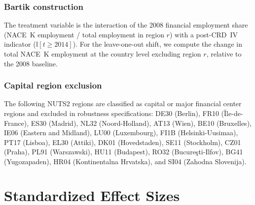 \documentclass[12pt]{article}
\newcommand{\ind}{\mathbb{I}}
\begin{document}
\subsubsection*{Bartik construction} The treatment variable is the interaction of the 2008 financial employment share (NACE~K employment / total employment in region $r$) with a post-CRD~IV indicator ($\ind[t \geq 2014]$). For the leave-one-out shift, we compute the change in total NACE~K employment at the country level excluding region $r$, relative to the 2008 baseline.

\subsubsection*{Capital region exclusion} The following NUTS2 regions are classified as capital or major financial center regions and excluded in robustness specifications: DE30 (Berlin), FR10 (\^{I}le-de-France), ES30 (Madrid), NL32 (Noord-Holland), AT13 (Wien), BE10 (Bruxelles), IE06 (Eastern and Midland), LU00 (Luxembourg), FI1B (Helsinki-Uusimaa), PT17 (Lisboa), EL30 (Attiki), DK01 (Hovedstaden), SE11 (Stockholm), CZ01 (Praha), PL91 (Warszawski), HU11 (Budapest), RO32 (Bucure\c{s}ti-Ilfov), BG41 (Yugozapaden), HR04 (Kontinentalna Hrvatska), and SI04 (Zahodna Slovenija).

\section{Standardized Effect Sizes}
\label{sec:sde}


\end{document}
